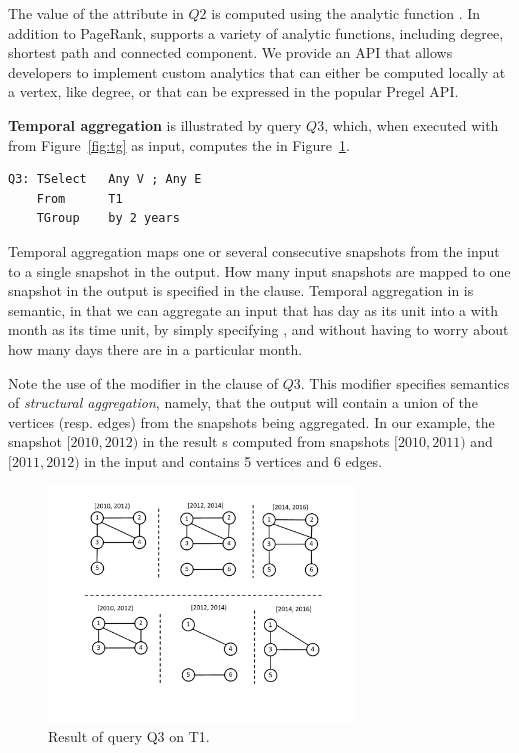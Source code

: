 The value of the attribute  in $Q2$ is computed using the
analytic function .  In addition to PageRank, \ql
supports a variety of analytic functions, including degree, shortest
path and connected component.  We provide an API that allows
developers to implement custom analytics that can either be computed
locally at a vertex, like degree, or that can be expressed in the
popular Pregel API. 

{\bf Temporal aggregation} is illustrated by query $Q3$, which, when
executed with  from Figure~\ref{fig:tg} as input, computes
the \tg in Figure~\ref{fig:tg_any}.

\begin{verbatim}
Q3: TSelect   Any V ; Any E 
    From      T1
    TGroup    by 2 years
\end{verbatim}

Temporal aggregation maps one or several consecutive snapshots from
the input to a single snapshot in the output.  How many input
snapshots are mapped to one snapshot in the output is specified in the
 clause.  Temporal aggregation in \ql is semantic, in
that we can aggregate an input \tg that has day as its unit into a \tg
with month as its time unit, by simply specifying , and without having to worry about how many days there are in
a particular month.

Note the use of the modifier  in the  clause
of $Q3$.  This modifier specifies semantics of {\em structural
  aggregation}, namely, that the output will contain a union of the
vertices (resp. edges) from the snapshots being aggregated.  In our
example, the snapshot $[2010, 2012)$ in the result s computed from
  snapshots $[2010, 2011)$ and $[2011, 2012)$ in the input and
      contains 5 vertices and 6 edges.

\begin{figure}
\includegraphics[width=3.2in]{figs/TGroupAny.pdf}
\caption{Result of query Q3 on T1.}
\label{fig:tg_any}
\end{figure}

